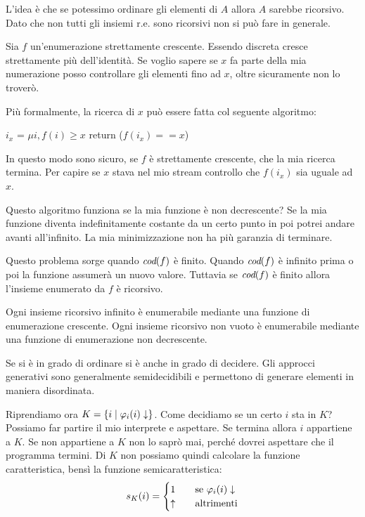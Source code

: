 L'idea è che se potessimo ordinare gli elementi di $A$ allora $A$ sarebbe ricorsivo. Dato che non tutti
gli insiemi r.e. sono ricorsivi non si può fare in generale.

Sia $f$ un'enumerazione strettamente crescente. Essendo discreta cresce strettamente più
dell'identità. Se voglio sapere se $x$ fa parte della mia numerazione posso controllare gli elementi
fino ad $x$, oltre sicuramente non lo troverò.

Più formalmente, la ricerca di $x$ può essere fatta col seguente algoritmo:
\begin{python}
    $i_{x}$ = $\mu i, f(i) \geq x$
    return ($f(i_{x}) == x$)
\end{python}

In questo modo sono sicuro, se $f$ è strettamente crescente, che la mia ricerca termina. Per capire
se $x$ stava nel mio stream controllo che $f(i_{x})$ sia uguale ad $x$. 

Questo algoritmo funziona se la mia funzione è non decrescente? Se la mia funzione diventa
indefinitamente costante da un certo punto in poi potrei andare avanti all'infinito. La mia
minimizzazione non ha più garanzia di terminare.

Questo problema sorge quando $\textit{cod}(f)$ è finito. Quando $\textit{cod}(f)$ è infinito prima o poi la funzione
assumerà un nuovo valore. Tuttavia se $\textit{cod}(f)$ è finito allora l'insieme enumerato da $f$ è
ricorsivo.

Ogni insieme ricorsivo infinito è enumerabile mediante una funzione di enumerazione crescente. Ogni
insieme ricorsivo non vuoto è enumerabile mediante una funzione di enumerazione non decrescente.

Se si è in grado di ordinare si è anche in grado di decidere. Gli approcci generativi sono
generalmente semidecidibili e permettono di generare elementi in maniera disordinata.

Riprendiamo ora $K = \{i \mid \varphi_{i}(i) \downarrow\}$. Come decidiamo se un certo $i$ sta in $K$? Possiamo far
partire il mio interprete e aspettare. Se termina allora $i$ appartiene a $K.$ Se non appartiene a
$K$ non lo saprò mai, perché dovrei aspettare che il programma termini. Di $K$ non possiamo quindi calcolare
la funzione caratteristica, bensì la funzione semicaratteristica:
\begin{equation*}
    s_{K}(i) = 
    \begin{cases}
        1 \quad &\text{se $\varphi_{i}(i) \downarrow$} \\
        \uparrow \quad &\text{altrimenti}
    \end{cases}
\end{equation*}

